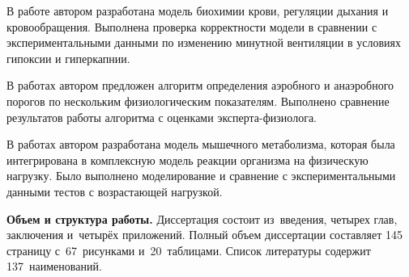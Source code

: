 В работе \cite{GolovCmodel2017} автором разработана модель биохимии крови, регуляции дыхания и кровообращения. Выполнена проверка корректности модели в сравнении с экспериментальными данными по изменению минутной вентиляции в условиях гипоксии и гиперкапнии.

В работах \cite{GolovIt2017,GolovSp2016, TimmeSp2016} автором предложен алгоритм определения аэробного и анаэробного порогов по нескольким физиологическим показателям. Выполнено сравнение результатов работы алгоритма с оценками эксперта-физиолога.

В работах \cite{GolovSp2015,GolovEkb2016} автором разработана модель мышечного метаболизма, которая была интегрирована в комплексную модель реакции организма на физическую нагрузку. Было выполнено моделирование и сравнение с экспериментальными данными тестов с возрастающей нагрузкой.

\textbf{Объем и структура работы.} Диссертация состоит из~введения, четырех глав, заключения и~четырёх приложений. Полный объем диссертации составляет 145 страницу с~67~рисунками и~20~таблицами. Список литературы содержит 137~наименований.

\clearpage